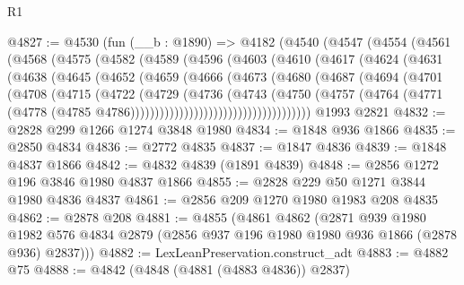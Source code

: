 \begin{lexlean}{R1}
\begin{coremodule}
@4827 := @4530
    (fun (__b : @1890) =>
    @4182
      (@4540
        (@4547
          (@4554
            (@4561
              (@4568
                (@4575
                  (@4582
                    (@4589
                      (@4596
                        (@4603
                          (@4610
                            (@4617
                              (@4624
                                (@4631
                                  (@4638
                                    (@4645
                                      (@4652
                                        (@4659
                                          (@4666
                                            (@4673
                                              (@4680
                                                (@4687
                                                  (@4694
                                                    (@4701
                                                      (@4708
                                                        (@4715
                                                          (@4722
                                                            (@4729
                                                              (@4736
                                                                (@4743
                                                                  (@4750
                                                                    (@4757
                                                                      (@4764
                                                                        (@4771
                                                                          (@4778
                                                                            (@4785
                                                                              @4786)))))))))))))))))))))))))))))))))))))
    @1993
    @2821
@4832 := @2828 @299 @1266 @1274 @3848 @1980
@4834 := @1848 @936 @1866
@4835 := @2850 @4834
@4836 := @2772 @4835
@4837 := @1847 @4836
@4839 := @1848 @4837 @1866
@4842 := @4832 @4839 (@1891 @4839)
@4848 := @2856 @1272 @196 @3846 @1980 @4837 @1866
@4855 := @2828 @229 @50 @1271 @3844 @1980 @4836 @4837
@4861 := @2856 @209 @1270 @1980 @1983 @208 @4835
@4862 := @2878 @208
@4881 := @4855
    (@4861
      @4862
      (@2871
        @939
        @1980
        @1982
        @576
        @4834
        @2879
        (@2856 @937 @196 @1980 @1980 @936 @1866 (@2878 @936) @2837)))
@4882 := LexLeanPreservation.construct_adt
@4883 := @4882 @75
@4888 := @4842 (@4848 (@4881 (@4883 @4836)) @2837)

\end{coremodule}
\end{lexlean}
